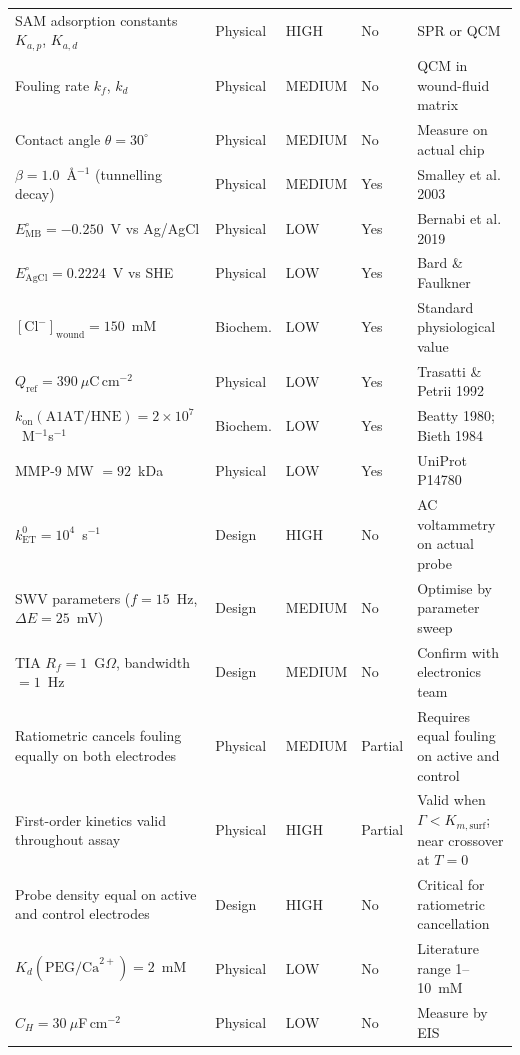 \documentclass[10pt,a4paper]{article}
\begin{document}
{\begin{longtable}{p{5.1cm}p{2.0cm}p{1.6cm}p{1.7cm}p{4.1cm}}
SAM adsorption constants $K_{a,p}$, $K_{a,d}$ & Physical & HIGH & No & SPR or QCM \\
Fouling rate $k_f$, $k_d$ & Physical & MEDIUM & No & QCM in wound-fluid matrix \\
Contact angle $\theta = 30^\circ$ & Physical & MEDIUM & No & Measure on actual chip \\
$\beta = 1.0$~\AA$^{-1}$ (tunnelling decay) & Physical & MEDIUM & Yes & Smalley et al. 2003 \\
$E^\circ_\text{MB} = -0.250$~V vs Ag/AgCl & Physical & LOW & Yes & Bernabi et al. 2019 \\
$E^\circ_\text{AgCl} = 0.2224$~V vs SHE & Physical & LOW & Yes & Bard \& Faulkner \\
$[\text{Cl}^-]_\text{wound} = 150$~mM & Biochem. & LOW & Yes & Standard physiological value \\
$Q_\text{ref} = 390~\mu$C\,cm$^{-2}$ & Physical & LOW & Yes & Trasatti \& Petrii 1992 \\
$k_\text{on}(\text{A1AT/HNE}) = 2\times10^7$~M$^{-1}$s$^{-1}$ & Biochem. & LOW & Yes & Beatty 1980; Bieth 1984 \\
MMP-9 MW $= 92$~kDa & Physical & LOW & Yes & UniProt P14780 \\
$k_\text{ET}^0 = 10^4$~s$^{-1}$ & Design & HIGH & No & AC voltammetry on actual probe \\
SWV parameters ($f = 15$~Hz, $\Delta E = 25$~mV) & Design & MEDIUM & No & Optimise by parameter sweep \\
TIA $R_f = 1$~G$\Omega$, bandwidth $= 1$~Hz & Design & MEDIUM & No & Confirm with electronics team \\
Ratiometric cancels fouling equally on both electrodes & Physical & MEDIUM & Partial & Requires equal fouling on active and control \\
First-order kinetics valid throughout assay & Physical & HIGH & Partial & Valid when $\Gamma < K_{m,\text{surf}}$; near crossover at $T = 0$ \\
Probe density equal on active and control electrodes & Design & HIGH & No & Critical for ratiometric cancellation \\
$K_d(\text{PEG/Ca}^{2+}) = 2$~mM & Physical & LOW & No & Literature range 1--10~mM \\
$C_H = 30~\mu$F\,cm$^{-2}$ & Physical & LOW & No & Measure by EIS \\
\end{longtable}
}
\end{document}
